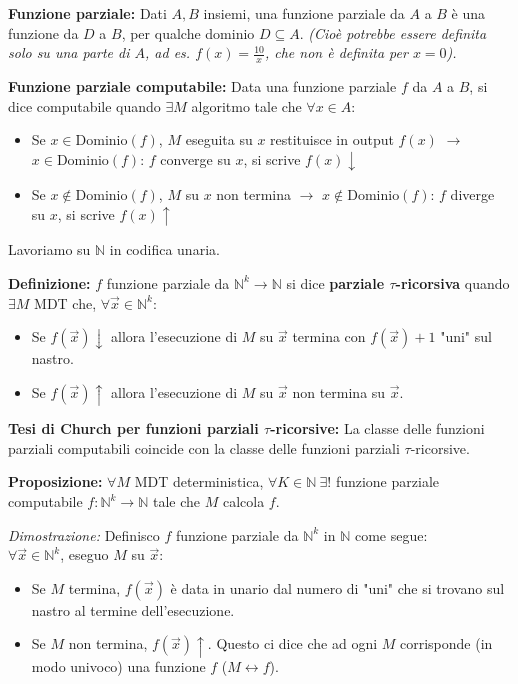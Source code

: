 \textbf{Funzione parziale:} Dati $A, B$ insiemi, una funzione parziale da $A$ a $B$ è una funzione da $D$ a $B$, per qualche dominio $D \subseteq A$. \textit{(Cioè potrebbe essere definita solo su una parte di $A$, ad es. $f(x) = \frac{10}{x}$, che non è definita per $x=0$).}

\vspace{0.4cm}
\textbf{Funzione parziale computabile:} Data una funzione parziale $f$ da $A$ a $B$, si dice computabile quando $\exists M$ algoritmo tale che $\forall x \in A$:
\begin{itemize}
    \item Se $x \in \text{Dominio}(f)$, $M$ eseguita su $x$ restituisce in output $f(x)$ $\longrightarrow$ $x \in \text{Dominio}(f)$: $f$ converge su $x$, si scrive \textbf{$f(x)\downarrow$}
    \item Se $x \notin \text{Dominio}(f)$, $M$ su $x$ non termina $\longrightarrow$ $x \notin \text{Dominio}(f)$: $f$ diverge su $x$, si scrive \textbf{$f(x)\uparrow$}
\end{itemize}

Lavoriamo su $\mathbb{N}$ in codifica unaria.

\textbf{Definizione:} $f$ funzione parziale da $\mathbb{N}^k \to \mathbb{N}$ si dice \textbf{parziale $\tau$-ricorsiva} quando $\exists M$ MDT che, $\forall \vec{x} \in \mathbb{N}^k$:
\begin{itemize}
    \item Se $f(\vec{x})\downarrow$ allora l'esecuzione di $M$ su $\vec{x}$ termina con $f(\vec{x})+1$ "uni" sul nastro.
    \item Se $f(\vec{x})\uparrow$ allora l'esecuzione di $M$ su $\vec{x}$ non termina su $\vec{x}$.
\end{itemize}

\vspace{0.4cm}
\textbf{Tesi di Church per funzioni parziali $\tau$-ricorsive:} La classe delle funzioni parziali computabili coincide con la classe delle funzioni parziali $\tau$-ricorsive.

\vspace{0.4cm}
\textbf{Proposizione:} $\forall M$ MDT deterministica, $\forall K \in \mathbb{N} \ \exists!$ funzione parziale computabile $f: \mathbb{N}^k \to \mathbb{N}$ tale che $M$ calcola $f$.

\textit{Dimostrazione:}
Definisco $f$ funzione parziale da $\mathbb{N}^k$ in $\mathbb{N}$ come segue: \\
$\forall \vec{x} \in \mathbb{N}^k$, eseguo $M$ su $\vec{x}$:
\begin{itemize}
    \item Se $M$ termina, $f(\vec{x})$ è data in unario dal numero di "uni" che si trovano sul nastro al termine dell'esecuzione.
    \item Se $M$ non termina, $f(\vec{x})\uparrow$. Questo ci dice che ad ogni $M$ corrisponde (in modo univoco) una funzione $f$ ($M \longleftrightarrow f$).
\end{itemize}








